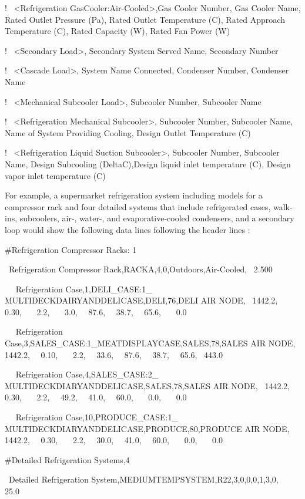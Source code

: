 !~ \textless{}Refrigeration GasCooler:Air-Cooled\textgreater{},Gas Cooler Number, Gas Cooler Name, Rated Outlet Pressure (Pa), Rated Outlet Temperature (C), Rated Approach Temperature (C), Rated Capacity (W), Rated Fan Power (W)

!~ \textless{}Secondary Load\textgreater{}, Secondary System Served Name, Secondary Number

!~ \textless{}Cascade Load\textgreater{}, System Name Connected, Condenser Number, Condenser Name

!~ \textless{}Mechanical Subcooler Load\textgreater{}, Subcooler Number, Subcooler Name

!~ \textless{}Refrigeration Mechanical Subcooler\textgreater{}, Subcooler Number, Subcooler Name, Name of System Providing Cooling, Design Outlet Temperature (C)

!~ \textless{}Refrigeration Liquid Suction Subcooler\textgreater{}, Subcooler Number, Subcooler Name, Design Subcooling (DeltaC),Design liquid inlet temperature (C), Design vapor inlet temperature (C)

For example, a supermarket refrigeration system including models for a compressor rack and four detailed systems that include refrigerated cases, walk-ins, subcoolers, air-, water-, and evaporative-cooled condensers, and a secondary loop would show the following data lines following the header lines :

\#Refrigeration Compressor Racks: 1

~Refrigeration Compressor Rack,RACKA,4,0,Outdoors,Air-Cooled,~ 2.500

~~ Refrigeration Case,1,DELI\_CASE:1\_ MULTIDECKDAIRYANDDELICASE,DELI,76,DELI AIR NODE,~ 1442.2,~~ 0.30,~~~ 2.2,~~~ 3.0,~~ 87.6,~~ 38.7,~~ 65.6,~~~ 0.0

~~ Refrigeration Case,3,SALES\_CASE:1\_MEATDISPLAYCASE,SALES,78,SALES AIR NODE,~ 1442.2,~~ 0.10,~~~ 2.2,~~ 33.6,~~ 87.6,~~ 38.7,~~ 65.6,~ 443.0

~~ Refrigeration Case,4,SALES\_CASE:2\_ MULTIDECKDIARYANDDELICASE,SALES,78,SALES AIR NODE,~ 1442.2,~~ 0.30,~~~ 2.2,~~ 49.2,~~ 41.0,~~ 60.0,~~~ 0.0,~~~ 0.0

~~ Refrigeration Case,10,PRODUCE\_CASE:1\_ MULTIDECKDIARYANDDELICASE,PRODUCE,80,PRODUCE AIR NODE,~ 1442.2,~~ 0.30,~~~ 2.2,~~ 30.0,~~ 41.0,~~ 60.0,~~~ 0.0,~~~ 0.0

\#Detailed Refrigeration Systems,4

~Detailed Refrigeration System,MEDIUMTEMPSYSTEM,R22,3,0,0,0,1,3,0,~~~ 25.0

